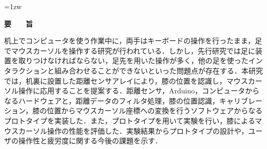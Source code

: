 \documentclass[a4paper,11pt]{jreport}
\author{市川　佑}
\begin{document}
\maketitle
\thispagestyle{empty}
\newpage

\thispagestyle{empty}
\vspace*{20pt plus 1fil}
\parindent=1zw
\noindent
\begin{center}
{\Large \bf 要　　旨}
\vspace{2cm}
\end{center}
机上でコンピュータを使う作業中に，両手はキーボードの操作を行ったまま，足でマウスカーソルを操作する研究が行われている．しかし，先行研究では足に装置を取りつけなければならない，足先を用いた操作が多く，他の足を使ったインタラクションと組み合わせることができないといった問題点が存在する．本研究では，机裏に設置した距離センサアレイにより，膝の位置を認識し，マウスカーソル操作に応用することを提案する．距離センサ，Arduino，コンピュータからなるハードウェアと，距離データのフィルタ処理，膝の位置認識，キャリブレーション，膝の位置からマウスカーソル座標への変換を行うソフトウェアからなるプロトタイプを実装した．また，プロトタイプを用いて実験を行い，膝によるマウスカーソル操作の性能を評価した．実験結果からプロトタイプの設計や，ユーザの操作性と疲労度に関する今後の課題を示す．

\par
\vspace{0pt plus 1fil}
\newpage

\tableofcontents
\listoffigures
\listoftables

\pagebreak \setcounter{page}{1}



%











\end{document}
